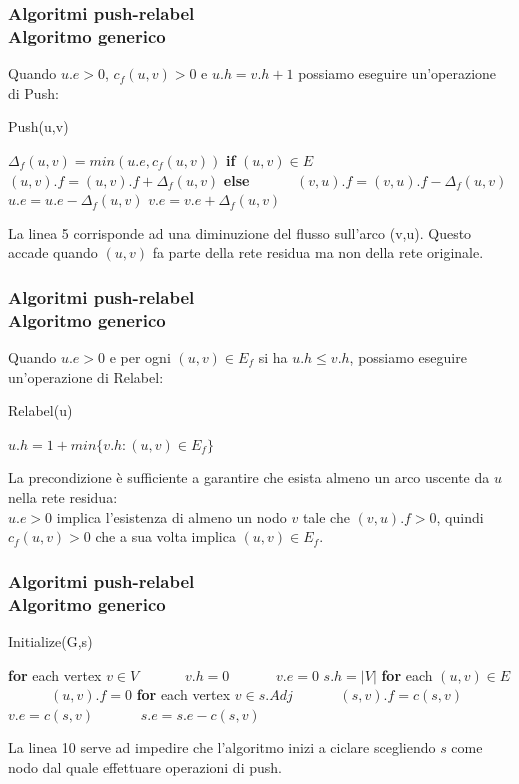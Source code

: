 \documentclass{beamer}
\begin{document}
\begin{frame}
\frametitle{Algoritmi push-relabel\\Algoritmo generico}
Quando $u.e>0$, $c_f(u,v)>0$ e $u.h=v.h+1$ possiamo eseguire un'operazione di Push:
\begin{algorithm}[H]
    \caption{Push(u,v)}%
    \begin{algorithmic}[1]
        \State $\Delta_f(u,v)=min(u.e,c_f(u,v))$
        \State \textbf{if} $(u,v)\in E$
        \State \ \ \ \ \ \ $(u,v).f = (u,v).f+\Delta_f(u,v)$
        \State \textbf{else}
        \State \ \ \ \ \ \ $(v,u).f = (v,u).f-\Delta_f(u,v)$
        \State $u.e=u.e-\Delta_f(u,v)$
        \State $v.e=v.e+\Delta_f(u,v)$
    \end{algorithmic}
    \label{alg_1}
\end{algorithm}
La linea 5 corrisponde ad una diminuzione del flusso sull'arco (v,u). Questo accade quando $(u,v)$ fa parte della rete residua ma non della rete originale.
\end{frame}

\begin{frame}
\frametitle{Algoritmi push-relabel\\Algoritmo generico}
Quando $u.e>0$ e per ogni $(u,v)\in E_f$ si ha $u.h\leq v.h$, possiamo eseguire un'operazione di Relabel:
\begin{algorithm}[H]
    \caption{Relabel(u)}%
    \begin{algorithmic}[1]
        \State $u.h=1+min\{v.h:(u,v)\in E_f\}$
    \end{algorithmic}
    \label{alg_1}
\end{algorithm}
La precondizione è sufficiente a garantire che esista almeno un arco uscente da $u$ nella rete residua:\\
$u.e>0$ implica l'esistenza di almeno un nodo $v$ tale che $(v,u).f>0$,  quindi $c_f(u,v)>0$ che a sua volta implica $(u,v)\in E_f$.
\end{frame}

\begin{frame}
\frametitle{Algoritmi push-relabel\\Algoritmo generico}
\begin{algorithm}[H]
    \caption{Initialize(G,s)}%
    \begin{algorithmic}[1]
        \State \textbf{for} each vertex $v\in V$
        \State \ \ \ \ \ \ $v.h=0$
        \State \ \ \ \ \ \ $v.e=0$
        \State $s.h=|V|$
        \State \textbf{for} each $(u,v)\in E$
        \State \ \ \ \ \ \ $(u,v).f=0$
        \State \textbf{for} each vertex $v\in s.Adj$
        \State \ \ \ \ \ \ $(s,v).f=c(s,v)$
        \State \ \ \ \ \ \ $v.e=c(s,v)$
        \State \ \ \ \ \ \ $s.e=s.e-c(s,v)$
    \end{algorithmic}
    \label{alg_1}
\end{algorithm}
La linea 10 serve ad impedire che l'algoritmo inizi a ciclare scegliendo $s$ come nodo dal quale effettuare operazioni di push.
\end{frame}
\end{document}
